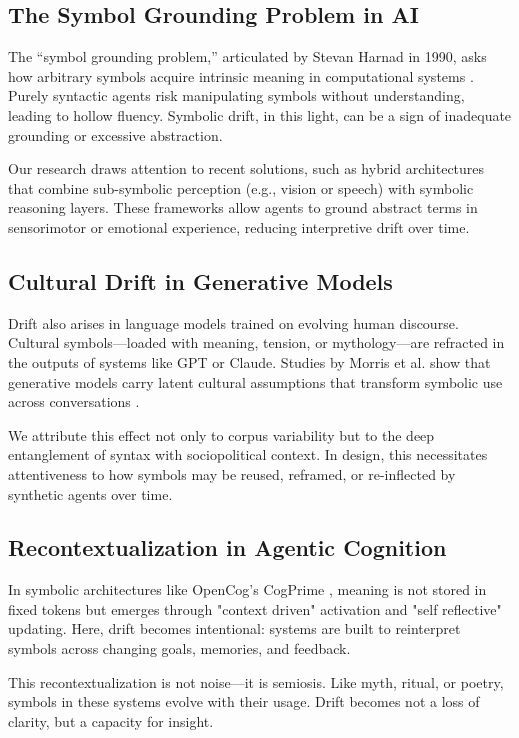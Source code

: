 \documentclass[twocolumn,10pt]{article}
\begin{document}
\subsection{The Symbol Grounding Problem in AI}

The ``symbol grounding problem,'' articulated by Stevan Harnad in 1990, asks how arbitrary symbols acquire intrinsic meaning in computational systems \cite{harnad1990symbol}. Purely syntactic agents risk manipulating symbols without understanding, leading to hollow fluency. Symbolic drift, in this light, can be a sign of inadequate grounding or excessive abstraction.

Our research draws attention to recent solutions, such as hybrid architectures that combine sub-symbolic perception (e.g., vision or speech) with symbolic reasoning layers. These frameworks allow agents to ground abstract terms in sensorimotor or emotional experience, reducing interpretive drift over time.

\subsection{Cultural Drift in Generative Models}

Drift also arises in language models trained on evolving human discourse. Cultural symbols—loaded with meaning, tension, or mythology—are refracted in the outputs of systems like GPT or Claude. \newpage Studies by Morris et al. show that generative models carry latent cultural assumptions that transform symbolic use across conversations \cite{morris2021cultural}.

We attribute this effect not only to corpus variability but to the deep entanglement of syntax with sociopolitical context. In design, this necessitates attentiveness to how symbols may be reused, reframed, or re-inflected by synthetic agents over time.

\subsection{Recontextualization in Agentic Cognition}

In symbolic architectures like OpenCog’s CogPrime \cite{goertzel2010cogprime}, meaning is not stored in fixed tokens but emerges through "context driven" activation and "self reflective" updating. Here, drift becomes intentional: systems are built to reinterpret symbols across changing goals, memories, and feedback.

This recontextualization is not noise—it is semiosis. Like myth, ritual, or poetry, symbols in these systems evolve with their usage. Drift becomes not a loss of clarity, but a capacity for insight.
\end{document}
